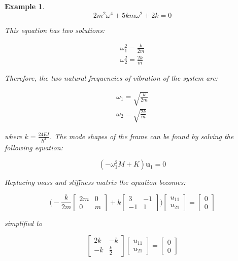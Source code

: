 \documentclass[12pt,letter]{article}
\newtheorem{ex}{Example}
\numberwithin{ex}{section} %
\newenvironment{example}{\begin{mdframed}[middlelinewidth=0.5mm]\begin{ex}\normalfont}{\end{ex}\end{mdframed}}
\numberwithin{re}{section} %
\numberwithin{vcs}{section} %
\begin{document}
\begin{example}
\begin{equation}
2m^2 \omega^4 + 5 k m \omega^2 + 2 k = 0
\end{equation}

\noindent This equation has two solutions:

\begin{eqnarray}
\omega_1^2 = \frac{k}{2 m}\\
\omega_2^2 = \frac{2 k}{m}
\end{eqnarray}

\noindent Therefore, the two natural frequencies of vibration of the system are:

\begin{eqnarray}
\omega_1 = \sqrt{\frac{k}{2 m}}\\
\omega_2 = \sqrt{\frac{2 k}{m}}
\end{eqnarray}

\noindent where $k = \frac{24EI}{h^3}$. The mode shapes of the frame can be found by solving the following equation:

\begin{equation}
(-\omega_1^2 M  + K)\mathbf{u}_1 =0
\end{equation}

\noindent Replacing mass and stiffness matrix the equation becomes:

\begin{equation}
\bigg(-\frac{k}{2 m}\begin{bmatrix}  2m & 0 \\   0  & m \end{bmatrix} + k \begin{bmatrix} 3 & -1 \\    -1  & 1 \end{bmatrix}\bigg)\begin{bmatrix} u_{11}\\ u_{21}\end{bmatrix} = \begin{bmatrix} 0\\ 0\end{bmatrix}
\end{equation}

\noindent simplified to

\begin{equation}
\begin{bmatrix} 2k & -k \\    -k  & \frac{k}{2} \end{bmatrix} 
\begin{bmatrix} u_{11}\\ u_{21}\end{bmatrix}=\begin{bmatrix} 0\\ 0\end{bmatrix}
\end{equation}


\end{example}
\end{document}
